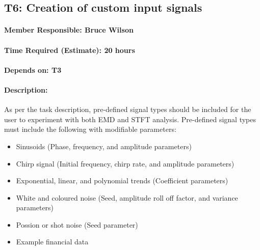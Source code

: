 \documentclass[
  paper=a4,
  ,captions=tableheading
]{scrartcl}
\begin{document}
\newpage
\hypertarget{t6-creation-of-custom-input-signals}{%
\subsection{T6: Creation of custom input
signals}\label{t6-creation-of-custom-input-signals}}

\hypertarget{member-responsible-bruce-wilson-1}{%
\paragraph{Member Responsible: Bruce
Wilson}\label{member-responsible-bruce-wilson-1}}

\hypertarget{time-required-estimate-20-hours-1}{%
\paragraph{Time Required (Estimate): 20
hours}\label{time-required-estimate-20-hours-1}}

\hypertarget{depends-on-t3-1}{%
\paragraph{Depends on: T3}\label{depends-on-t3-1}}

\hypertarget{description-4}{%
\paragraph{Description:}\label{description-4}}

As per the task description, pre-defined signal types should be included
for the user to experiment with both EMD and STFT analysis. Pre-defined
signal types must include the following with modifiable parameters: 

\begin{itemize}
	\item Sinusoids (Phase, frequency, and amplitude parameters) 
	\item Chirp signal (Initial frequency, chirp rate, and amplitude parameters) 
	\item Exponential, linear, and polynomial trends (Coefficient parameters) 
	\item White and coloured noise (Seed, amplitude roll off factor, and variance parameters) 
	\item Possion or shot noise (Seed parameter) 
	\item Example financial data
\end{itemize}
\end{document}
